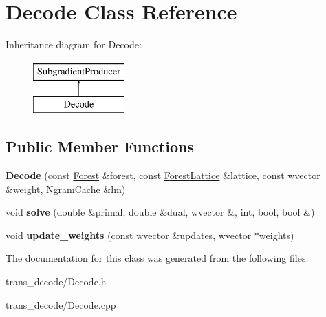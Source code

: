 \hypertarget{classDecode}{
\section{Decode Class Reference}
\label{classDecode}
}
Inheritance diagram for Decode:\begin{figure}[H]
\begin{center}
\leavevmode
\includegraphics[height=2cm]{classDecode}
\end{center}
\end{figure}
\subsection*{Public Member Functions}
\begin{DoxyCompactItemize}
\item 
\hypertarget{classDecode_a57bd53ddaf49e2fe4b86a7aad782110f}{
{\bfseries Decode} (const \hyperlink{classForest}{Forest} \&forest, const \hyperlink{classForestLattice}{ForestLattice} \&lattice, const wvector \&weight, \hyperlink{classNgramCache}{NgramCache} \&lm)}
\label{classDecode_a57bd53ddaf49e2fe4b86a7aad782110f}

\item 
\hypertarget{classDecode_a6d86f91ee2c591c54ce2bb97c1dd6888}{
void {\bfseries solve} (double \&primal, double \&dual, wvector \&, int, bool, bool \&)}
\label{classDecode_a6d86f91ee2c591c54ce2bb97c1dd6888}

\item 
\hypertarget{classDecode_a9beca60221318f111b7f4d5acca8e329}{
void {\bfseries update\_\-weights} (const wvector \&updates, wvector $\ast$weights)}
\label{classDecode_a9beca60221318f111b7f4d5acca8e329}

\end{DoxyCompactItemize}


The documentation for this class was generated from the following files:\begin{DoxyCompactItemize}
\item 
trans\_\-decode/Decode.h\item 
trans\_\-decode/Decode.cpp\end{DoxyCompactItemize}
